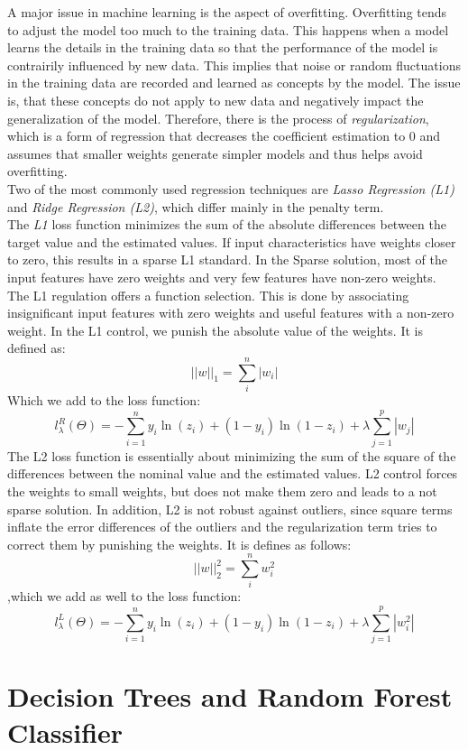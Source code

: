 \documentclass[a4paper, 11pt,titlepage,oneside,openany]{book}
\begin{document}
\noindent A major issue in machine learning is the aspect of overfitting. Overfitting tends to adjust the model too much to the training data. This happens when a model learns the details in the training data so that the performance of the model is contrairily influenced by new data. This implies that noise or random fluctuations in the training data are recorded and learned as concepts by the model. The issue is, that these concepts do not apply to new data and negatively impact the generalization of the model. Therefore, there is the process of \textit{regularization}, which is a form of regression that decreases the coefficient estimation to $0$ and assumes that smaller weights generate simpler models and thus helps avoid overfitting. \\
\noindent Two of the most commonly used regression techniques are \textit{Lasso Regression (L1)} and \textit{Ridge Regression (L2)}, which differ mainly in the penalty term. \\
\noindent The \textit{L1} loss function minimizes the sum of the absolute differences between the target value and the estimated values. If input characteristics have weights closer to zero, this results in a sparse L1 standard. In the Sparse solution, most of the input features have zero weights and very few features have non-zero weights. The L1 regulation offers a function selection. This is done by associating insignificant input features with zero weights and useful features with a non-zero weight.  In the L1 control, we punish the absolute value of the weights. It is defined as:
\[
||w||_1=\sum_{i}^{n}|w_i|
\]
Which we add to the loss function:
\[
l_\lambda^R(\Theta)=-\sum_{i=1}^{n}y_i\ln(z_i)+(1-y_i)\ln(1-z_i)+\lambda\sum_{j=1}^{p}|w_j|
\]
The L2 loss function is essentially about minimizing the sum of the square of the differences between the nominal value and the estimated values.
L2 control forces the weights to small weights, but does not make them zero and leads to a not sparse solution. In addition, L2 is not robust against outliers, since square terms inflate the error differences of the outliers and the regularization term tries to correct them by punishing the weights. It is defines as follows:
\[
||w||_2^2=\sum_{i}^{n}w_i^2
\]
,which we add as well to the loss function:
\[
l_\lambda^L(\Theta)=-\sum_{i=1}^{n}y_i\ln(z_i)+(1-y_i)\ln(1-z_i)+\lambda\sum_{j=1}^{p}|w_i^2|
\]

\section{Decision Trees and Random Forest Classifier}
\end{document}
